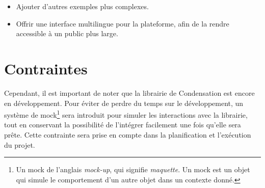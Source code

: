 \begin{itemize}
    \item Ajouter d'autres exemples plus complexes.
    \item Offrir une interface multilingue pour la plateforme, afin de la rendre accessible à un public plus large.
\end{itemize}

\section*{Contraintes}
Cependant, il est important de noter que la librairie de Condensation est encore en développement. Pour éviter de perdre du temps sur le développement, un système de mock\footnote{Un mock de l'anglais \textit{mock-up}, qui signifie \textit{maquette}. Un mock est un objet qui simule le comportement d'un autre objet dans un contexte donné.} sera introduit pour simuler les interactions avec la librairie, tout en conservant la possibilité de l'intégrer facilement une fois qu'elle sera prête. Cette contrainte sera prise en compte dans la planification et l'exécution du projet.